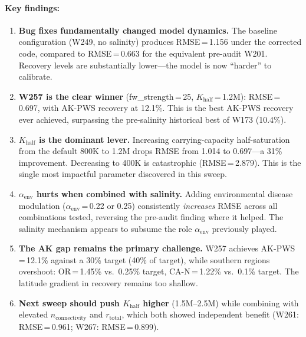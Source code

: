\documentclass[11pt,a4paper]{article}
\begin{document}
\paragraph{Key findings:}
\begin{enumerate}[leftmargin=*]
    \item \textbf{Bug fixes fundamentally changed model dynamics.} The baseline configuration (W249, no salinity) produces RMSE\,=\,1.156 under the corrected code, compared to RMSE\,=\,0.663 for the equivalent pre-audit W201. Recovery levels are substantially lower---the model is now ``harder'' to calibrate.

    \item \textbf{W257 is the clear winner} (fw\_strength\,=\,25, $K_{\text{half}}$\,=\,1.2M): RMSE\,=\,0.697, with AK-PWS recovery at 12.1\%. This is the best AK-PWS recovery ever achieved, surpassing the pre-salinity historical best of W173 (10.4\%).

    \item \textbf{$K_{\text{half}}$ is the dominant lever.} Increasing carrying-capacity half-saturation from the default 800K to 1.2M drops RMSE from 1.014 to 0.697---a 31\% improvement. Decreasing to 400K is catastrophic (RMSE\,=\,2.879). This is the single most impactful parameter discovered in this sweep.

    \item \textbf{$\alpha_{\text{env}}$ hurts when combined with salinity.} Adding environmental disease modulation ($\alpha_{\text{env}}$\,=\,0.22 or 0.25) consistently \emph{increases} RMSE across all combinations tested, reversing the pre-audit finding where it helped. The salinity mechanism appears to subsume the role $\alpha_{\text{env}}$ previously played.

    \item \textbf{The AK gap remains the primary challenge.} W257 achieves AK-PWS\,=\,12.1\% against a 30\% target (40\% of target), while southern regions overshoot: OR\,=\,1.45\% vs.\ 0.25\% target, CA-N\,=\,1.22\% vs.\ 0.1\% target. The latitude gradient in recovery remains too shallow.

    \item \textbf{Next sweep should push $K_{\text{half}}$ higher} (1.5M--2.5M) while combining with elevated $n_{\text{connectivity}}$ and $r_{\text{total}}$, which both showed independent benefit (W261: RMSE\,=\,0.961; W267: RMSE\,=\,0.899).
\end{enumerate}

\clearpage
\end{document}
